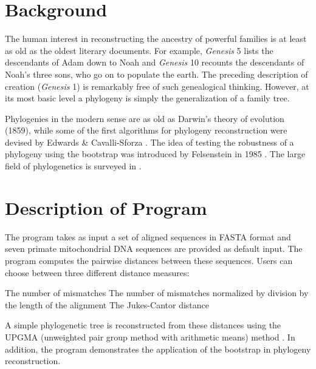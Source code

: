 \section{Background}
The human interest in reconstructing the ancestry of powerful families
is at least as old as the oldest literary documents. For example, 
\textit{Genesis} 5 lists the descendants of Adam down to Noah and 
\textit{Genesis} 10 recounts the descendants of Noah's three sons, who go
on to populate the earth. The preceding description of creation
(\textit{Genesis} 1) is remarkably free of such genealogical thinking.
However, at its most basic level a phylogeny is simply the generalization
of a family tree. 

Phylogenies in the modern sense are as old as Darwin's theory of
evolution (1859), while some of the first algorithms for phylogeny
reconstruction were devised by Edwards \& Cavalli-Sforza
\cite{edw64:rec}. The idea of testing the robustness of a phylogeny
using the bootstrap \cite{efr79:boo} was introduced by Felsenstein in
1985 \cite{fel85:con}. The large field of phylogenetics is surveyed in
\cite{swo96:phy,pag98:mol,fel04:inf}. 


\section{Description of Program}
The program takes as input a set of aligned sequences in FASTA
format and seven primate mitochondrial DNA sequences are provided as
default input. The program computes the pairwise distances between
these sequences. Users can choose between three different distance
measures:
\begin{enumerate}
  \I The number of mismatches
  \I The number of mismatches normalized by division by the length of the alignment 
  \I The Jukes-Cantor distance \cite{juk69:evo}
\end{enumerate}

A simple phylogenetic tree is reconstructed from these distances using the
 UPGMA (unweighted pair group method with arithmetic means)
method \cite{sok63:pri}. In addition, the program demonstrates the
 application of the 
bootstrap in phylogeny reconstruction.

